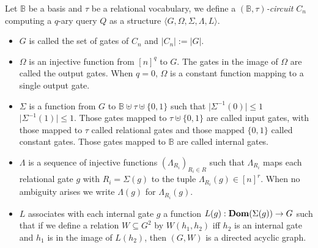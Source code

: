 \documentclass[../paper.tex]{subfiles}
\begin{document}
\begin{definition}
  Let $\mathbb{B}$ be a basis and $\tau$ be a relational vocabulary, we define a
  \emph{$(\mathbb{B}, \tau)$-circuit} $C_n$ computing a $q$-ary query $Q$ as a
  structure $\langle G, \Omega, \Sigma, \Lambda, L \rangle$.
  \begin{itemize}
    \setlength\itemsep{0mm}
  \item $G$ is called the set of gates of $C_n$ and $\vert C_n \vert := \vert G
    \vert$.
  \item $\Omega$ is an injective function from $[n]^q$ to $G$. The gates in the
    image of $\Omega$ are called the output gates. When $q = 0$, $\Omega$ is a
    constant function mapping to a single output gate.
  \item $\Sigma$ is a function from $G$ to $\mathbb{B} \uplus \tau \uplus
    \{0,1\} $ such that $\vert \Sigma^{-1} (0) \vert \leq 1$ $\vert \Sigma^{-1}
    (1) \vert \leq 1$. Those gates mapped to $\tau \uplus \{0,1\}$ are called
    input gates, with those mapped to $\tau$ called relational gates and those
    mapped $\{0,1\}$ called constant gates. Those gates mapped to $\mathbb{B}$
    are called internal gates.
  \item $\Lambda$ is a sequence of injective functions $(\Lambda_{R_i})_{R_i \in
      R}$ such that $\Lambda_{R_i}$ maps each relational gate $g$ with $R_i =
    \Sigma (g)$ to the tuple $\Lambda_{R_i} (g) \in [n]^{r}$. When no ambiguity
    arises we write $\Lambda (g)$ for $\Lambda_{R_i} (g)$.
  \item $L$ associates with each internal gate $g$ a function $L(g):
    \text{\textbf{Dom}}(\Sigma(g)) \rightarrow G$ such that if we define a relation $W
    \subseteq G^{2}$ by $W(h_1,h_2)$ iff $h_2$ is an internal gate and $h_1$ is
    in the image of $L(h_2)$, then $(G, W)$ is a directed acyclic graph.
  \end{itemize}
\end{definition}
\end{document}
